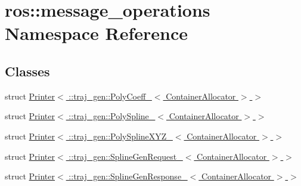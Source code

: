 \hypertarget{namespaceros_1_1message__operations}{}\section{ros\+:\+:message\+\_\+operations Namespace Reference}
\label{namespaceros_1_1message__operations}
\subsection*{Classes}
\begin{DoxyCompactItemize}
\item 
struct \hyperlink{structros_1_1message__operations_1_1_printer_3_01_1_1traj__gen_1_1_poly_coeff___3_01_container_allocator_01_4_01_4}{Printer$<$ \+::traj\+\_\+gen\+::\+Poly\+Coeff\+\_\+$<$ Container\+Allocator $>$ $>$}
\item 
struct \hyperlink{structros_1_1message__operations_1_1_printer_3_01_1_1traj__gen_1_1_poly_spline___3_01_container_allocator_01_4_01_4}{Printer$<$ \+::traj\+\_\+gen\+::\+Poly\+Spline\+\_\+$<$ Container\+Allocator $>$ $>$}
\item 
struct \hyperlink{structros_1_1message__operations_1_1_printer_3_01_1_1traj__gen_1_1_poly_spline_x_y_z___3_01_container_allocator_01_4_01_4}{Printer$<$ \+::traj\+\_\+gen\+::\+Poly\+Spline\+X\+Y\+Z\+\_\+$<$ Container\+Allocator $>$ $>$}
\item 
struct \hyperlink{structros_1_1message__operations_1_1_printer_3_01_1_1traj__gen_1_1_spline_gen_request___3_01_container_allocator_01_4_01_4}{Printer$<$ \+::traj\+\_\+gen\+::\+Spline\+Gen\+Request\+\_\+$<$ Container\+Allocator $>$ $>$}
\item 
struct \hyperlink{structros_1_1message__operations_1_1_printer_3_01_1_1traj__gen_1_1_spline_gen_response___3_01_container_allocator_01_4_01_4}{Printer$<$ \+::traj\+\_\+gen\+::\+Spline\+Gen\+Response\+\_\+$<$ Container\+Allocator $>$ $>$}
\end{DoxyCompactItemize}

